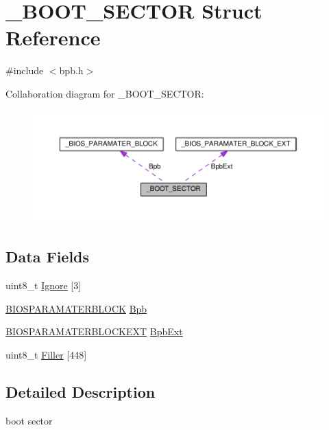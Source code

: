 \hypertarget{struct__BOOT__SECTOR}{}\section{\+\_\+\+B\+O\+O\+T\+\_\+\+S\+E\+C\+T\+OR Struct Reference}
\label{struct__BOOT__SECTOR}


{\ttfamily \#include $<$bpb.\+h$>$}



Collaboration diagram for \+\_\+\+B\+O\+O\+T\+\_\+\+S\+E\+C\+T\+OR\+:
\nopagebreak
\begin{figure}[H]
\begin{center}
\leavevmode
\includegraphics[width=350pt]{struct__BOOT__SECTOR__coll__graph}
\end{center}
\end{figure}
\subsection*{Data Fields}
\begin{DoxyCompactItemize}
\item 
uint8\+\_\+t \hyperlink{struct__BOOT__SECTOR_abcae473872a0324e463ab36564130d3d}{Ignore} \mbox{[}3\mbox{]}
\item 
\hyperlink{bpb_8h_af3ab7bfb42ad1b54891579f73be41bc1}{B\+I\+O\+S\+P\+A\+R\+A\+M\+A\+T\+E\+R\+B\+L\+O\+CK} \hyperlink{struct__BOOT__SECTOR_afedc563717fbacc0ce2e3b2fa31384bc}{Bpb}
\item 
\hyperlink{bpb_8h_a6da0cad454277100b4664773103a198d}{B\+I\+O\+S\+P\+A\+R\+A\+M\+A\+T\+E\+R\+B\+L\+O\+C\+K\+E\+XT} \hyperlink{struct__BOOT__SECTOR_ab175294dfdb20919b006865ac486df09}{Bpb\+Ext}
\item 
uint8\+\_\+t \hyperlink{struct__BOOT__SECTOR_abca94a8f55946d277eed33716aa8a612}{Filler} \mbox{[}448\mbox{]}
\end{DoxyCompactItemize}


\subsection{Detailed Description}
boot sector 

